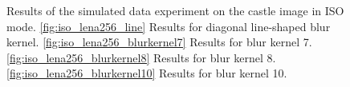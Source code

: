 \documentclass[12pt,notitlepage]{report}
\begin{document}
\clearpage

\begin{figure}[htb]
  \centering

  \caption[Results for the castle image in ISO mode]{Results of the simulated data experiment on the castle image in ISO mode. \ref{fig:iso_lena256_line} Results for diagonal line-shaped blur kernel. \ref{fig:iso_lena256_blurkernel7} Results for blur kernel 7. \ref{fig:iso_lena256_blurkernel8} Results for blur kernel 8. \ref{fig:iso_lena256_blurkernel10} Results for blur kernel 10.}
  \label{fig:iso_castle256}
\end{figure}
\end{document}
